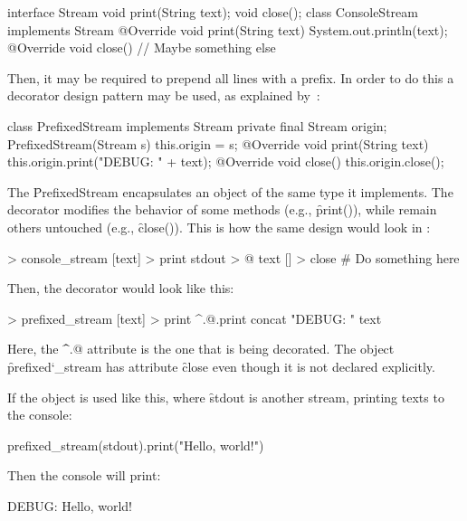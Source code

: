 \begin{eocode}
interface Stream {
  void print(String text);
  void close();
}
class ConsoleStream implements Stream {
  @Override
  void print(String text) {
    System.out.println(text);
  }
  @Override
  void close() {
    // Maybe something else
  }
}
\end{eocode}

Then, it may be required to prepend all lines with a prefix. In order
to do this a decorator design pattern may be used,
as explained by~\citet[p.196]{gamma1994design}:

\begin{eocode}
class PrefixedStream implements Stream {
  private final Stream origin;
  PrefixedStream(Stream s) {
    this.origin = s;
  }
  @Override
  void print(String text) {
    this.origin.print("DEBUG: " + text);
  }
  @Override
  void close() {
    this.origin.close();
  }
}
\end{eocode}

The \f{PrefixedStream} encapsulates an object of the same type it
implements. The decorator modifies the behavior of some methods (e.g., \f{print()}), while
remain others untouched (e.g., \f{close()}). This is how the same design
would look in \eo{}:

\begin{eocode}
[] > console_stream
  [text] > print
    stdout > @
      text
  [] > close
    # Do something here
\end{eocode}

Then, the decorator would look like this:

\begin{eocode}
[@] > prefixed_stream
  [text] > print
    ^.@.print
      concat
        "DEBUG: "
        text
\end{eocode}

Here, the \f{\^{}.@} attribute is the one that is being decorated.
The object \f{prefixed\char`_stream} has attribute \f{close} even
though it is not declared explicitly.

If the object is used like this, where \f{stdout} is another stream,
printing texts to the console:

\begin{eocode}
prefixed_stream(stdout).print("Hello, world!")
\end{eocode}

Then the console will print:

\begin{eocode}
DEBUG: Hello, world!
\end{eocode}

